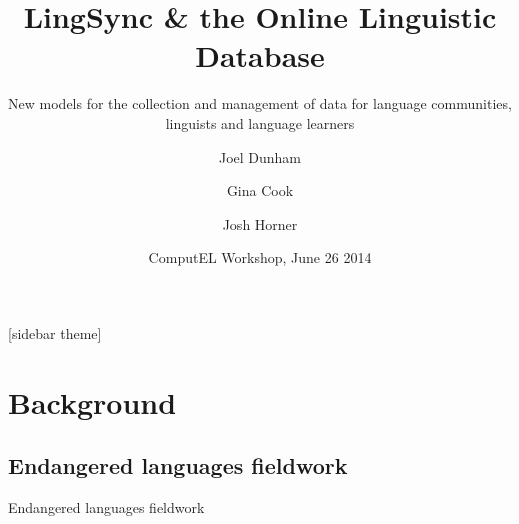 \documentclass{beamer}
\begin{document}
\title[LingSync \& OLD] %
{LingSync \& the Online Linguistic Database}



\author[~]{Joel Dunham  \and Gina Cook  \and Josh Horner }


\subtitle
{New models for the collection and management of data for language communities, linguists and
language learners}



\date[ComputEL 2014] %
{ComputEL Workshop, June 26 2014}



%

\begin{frame}
  \titlepage
\end{frame}
   [sidebar theme]

\section{Background}

\subsection[Fieldwork]{Endangered languages fieldwork}\label{sec:fieldwork}

\begin{frame}
Endangered languages fieldwork
\end{frame}
\end{document}
